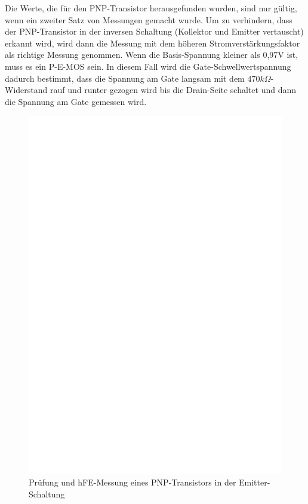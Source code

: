 Die Werte, die für den PNP-Transistor herausgefunden wurden, sind nur gültig, wenn ein zweiter Satz
von Messungen gemacht wurde.
Um zu verhindern, dass der PNP-Transistor in der inversen Schaltung (Kollektor und Emitter vertauscht) erkannt
wird, wird dann die Messung mit dem höheren Stromverstärkungsfaktor als richtige Messung genommen.
Wenn die Basis-Spannung kleiner als 0,97V ist, muss es ein P-E-MOS sein.
In diesem Fall wird die Gate-Schwellwertspannung dadurch bestimmt, dass die Spannung am Gate langsam mit dem
 \(470k\Omega\)-Widerstand rauf und runter gezogen wird bis die Drain-Seite schaltet und dann
die Spannung am Gate gemessen wird.

\begin{figure}[H]
\centering
\includegraphics[]{../FIG/PNPce.eps}
\caption{Prüfung und hFE-Messung eines PNP-Transistors in der Emitter-Schaltung}
\label{fig:pnpce}
\end{figure}

